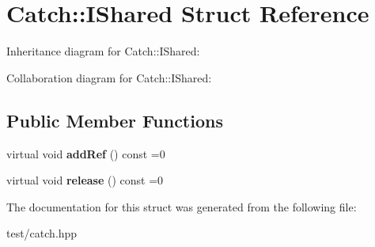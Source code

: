 \hypertarget{structCatch_1_1IShared}{}\section{Catch\+:\+:I\+Shared Struct Reference}
\label{structCatch_1_1IShared}


Inheritance diagram for Catch\+:\+:I\+Shared\+:


Collaboration diagram for Catch\+:\+:I\+Shared\+:
\subsection*{Public Member Functions}
\begin{DoxyCompactItemize}
\item 
virtual void {\bfseries add\+Ref} () const =0\hypertarget{structCatch_1_1IShared_ae383df68557cdaf0910b411af04d9e33}{}\label{structCatch_1_1IShared_ae383df68557cdaf0910b411af04d9e33}

\item 
virtual void {\bfseries release} () const =0\hypertarget{structCatch_1_1IShared_a002f52624728a763956fb6f230cb2f57}{}\label{structCatch_1_1IShared_a002f52624728a763956fb6f230cb2f57}

\end{DoxyCompactItemize}


The documentation for this struct was generated from the following file\+:\begin{DoxyCompactItemize}
\item 
test/catch.\+hpp\end{DoxyCompactItemize}
